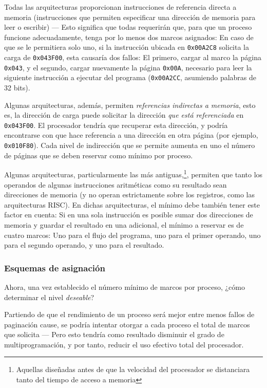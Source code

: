 \documentclass[11pt,fleqn]{book} %
\begin{document}
Todas las arquitecturas proporcionan instrucciones de referencia
directa a memoria (instrucciones que permiten especificar una
dirección de memoria para leer o escribir) — Esto significa que todas
requerirán que, para que un proceso funcione adecuadamente, tenga por
lo menos dos marcos asignados: En caso de que se le permitiera solo
uno, si la instrucción ubicada en \texttt{0x00A2C8} solicita la carga de
\texttt{0x043F00}, esta causaría dos fallos: El primero, cargar al marco la
página \texttt{0x043}, y el segundo, cargar nuevamente la página \texttt{0x00A},
necesario para leer la siguiente instrucción a ejecutar del programa
(\texttt{0x00A2CC}, asumiendo palabras de 32 bits).

Algunas arquitecturas, además, permiten \emph{referencias indirectas a memoria}, esto es, la dirección de carga puede solicitar la
dirección \emph{que está referenciada} en \texttt{0x043F00}. El procesador
tendría que recuperar esta dirección, y podría encontrarse con que
hace referencia a una dirección en otra página (por ejemplo,
\texttt{0x010F80}). Cada nivel de indirección que se permite aumenta en uno
el número de páginas que se deben reservar como mínimo por proceso.

Algunas arquitecturas, particularmente las más antiguas,\footnote{Aquellas
diseñadas antes de que la velocidad del procesador se distanciara
tanto del tiempo de acceso a memoria }, permiten que tanto los
operandos de algunas instrucciones aritméticas como su resultado sean
direcciones de memoria (y no operan estrictamente sobre los registros,
como las arquitecturas RISC). En dichas arquitecturas, el mínimo debe
también tener este factor en cuenta: Si en una sola instrucción
es posible sumar dos direcciones de memoria y guardar el resultado en
una adicional, el mínimo a reservar es de cuatro marcos: Uno para el
flujo del programa, uno para el primer operando, uno para el segundo
operando, y uno para el resultado.
\subsubsection{Esquemas de asignación}
\label{sec-5-5-4-2}


Ahora, una vez establecido el número mínimo de marcos por proceso,
¿cómo determinar el nivel \emph{deseable}?

Partiendo de que el rendimiento de un proceso será mejor entre menos
fallos de paginación cause, se podría intentar otorgar a cada proceso
el total de marcos que solicita — Pero esto tendría como resultado
disminuir el grado de multiprogramación, y por tanto, reducir el uso
efectivo total del procesador.
\end{document}
